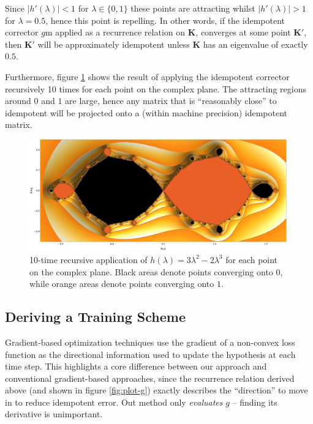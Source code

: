 \documentclass{article}
\theoremstyle{plain}
\theoremstyle{definition}
\theoremstyle{remark}
\newcommand{\vK}{\mathbf{K}}
\begin{document}
Since $|h'(\lambda)| < 1$ for $\lambda \in \{0, 1\}$ these points are attracting whilst $|h'(\lambda)| > 1$ for $\lambda = 0.5$, hence this point is repelling. In other words, if the idempotent corrector $g$m applied as a recurrence relation on $\vK$, converges at some point $\vK'$, then $\vK'$ will be approximately idempotent unless $\vK$ has an eigenvalue of exactly $0.5$.

Furthermore, figure \ref{fig:fractal} shows the result of applying the idempotent corrector recursively 10 times for each point on the complex plane. The attracting regions around $0$ and $1$ are large, hence any matrix that is ``reasonably close'' to idempotent will be projected onto a (within machine precision) idempotent matrix.

\begin{figure}[!htp]
    \centering
    \includegraphics[width=0.99\textwidth]{./resources/fractal.pdf}
    \caption{10-time recursive application of $h(\lambda) = 3\lambda^2 - 2\lambda^3$ for each point on the complex plane. Black areas denote points converging onto $0$, while orange areas denote points converging onto $1$.}
    \label{fig:fractal}
\end{figure}



\subsection{Deriving a Training Scheme}
\label{sec:method-scheme}
Gradient-based optimization techniques use the gradient of a non-convex loss function as the directional information used to update the hypothesis at each time step. This highlights a core difference between our approach and conventional gradient-based approaches, since the recurrence relation derived above (and shown in figure \ref{fig:plot-g}) exactly describes the ``direction'' to move in to reduce idempotent error. Out method only \textit{evaluates} $g$ -- finding its derivative is unimportant.
\end{document}
